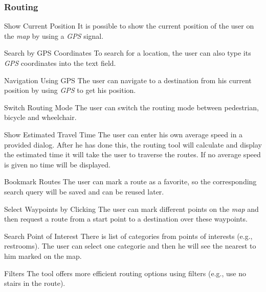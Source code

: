 
\subsubsection{Routing}
\begin{numerate}[FFR]
\item[Show Current Position]
It is possible to show the current position of the user on the \textit{map} by using a \textit{GPS} signal.
\item[Search by GPS Coordinates]
To search for a location, the user can also type its \textit{GPS} coordinates into the text field.
\item[Navigation Using GPS]
The user can navigate to a destination from his current position by using \textit{GPS} to get his position.
\item[Switch Routing Mode]
The user can switch the routing mode between pedestrian, bicycle and wheelchair.
\item[Show Estimated Travel Time]
The user can enter his own average speed in a provided dialog. After he has done this, the routing tool will calculate and display
the estimated time it will take the user to traverse the routes. If no average speed is given no time will be displayed.
\item[Bookmark Routes]
The user can mark a route as a favorite, so the corresponding search query will be saved and can be reused later.
\item[Select Waypoints by Clicking]
The user can mark different points on the \textit{map} and then request a route from a start point to a destination over these waypoints.
\item[Search Point of Interest]
There is list of categories from points of interests (e.g., restrooms). The user can select one categorie and then he will see the nearest to him marked on the map.
\item[Filters]
The tool offers more efficient routing options using filters (e.g., use no stairs in the route).
\end{numerate}
